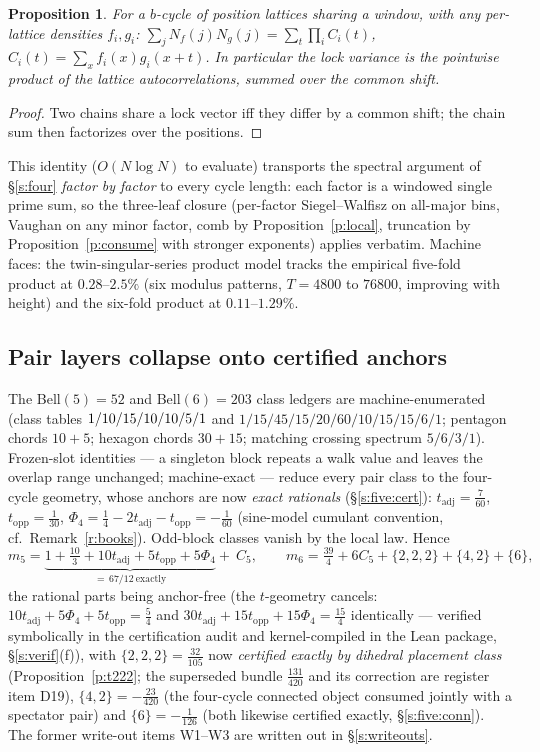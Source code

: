 \documentclass[11pt]{article}
\numberwithin{equation}{section}
\newtheorem{proposition}[theorem]{Proposition}
\theoremstyle{definition}
\theoremstyle{remark}
\begin{document}
\begin{proposition}\label{p:prod}
For a $b$-cycle of position lattices sharing a window, with any
per-lattice densities $f_i,g_i$:
$\sum_jN_f(j)N_g(j)=\sum_t\prod_iC_i(t)$,
$C_i(t)=\sum_xf_i(x)g_i(x+t)$. In particular the lock variance is
the pointwise product of the lattice autocorrelations, summed
over the common shift.
\end{proposition}

\begin{proof}
Two chains share a lock vector iff they differ by a common shift;
the chain sum then factorizes over the positions.
\end{proof}

This identity ($O(N\log N)$ to evaluate) transports the spectral
argument of \S\ref{s:four} \emph{factor by factor} to every cycle
length: each factor is a windowed single prime sum, so the
three-leaf closure (per-factor Siegel--Walfisz on all-major bins,
Vaughan on any minor factor, comb by Proposition~\ref{p:local},
truncation by Proposition~\ref{p:consume} with stronger
exponents) applies verbatim. Machine faces: the
twin-singular-series product model tracks the empirical five-fold
product at $0.28$--$2.5\%$ (six modulus patterns, $T=4800$ to
$76800$, improving with height) and the six-fold product at
$0.11$--$1.29\%$.

\subsection{Pair layers collapse onto certified anchors}

The Bell$(5)=52$ and Bell$(6)=203$ class ledgers are
machine-enumerated (class tables $1/10/15 \\
/10/10/5/1$ and
$1/15/45/15/20/60/10/15/15/6/1$; pentagon chords $10+5$; hexagon
chords $30+15$; matching crossing spectrum $5/6/3/1$).
Frozen-slot identities --- a singleton block repeats a walk value
and leaves the overlap range unchanged; machine-exact --- reduce
every pair class to the four-cycle geometry, whose anchors are
now \emph{exact rationals} (\S\ref{s:five:cert}):
$t_{\mathrm{adj}}=\tfrac7{60}$, $t_{\mathrm{opp}}=\tfrac1{30}$,
$\Phi_4=\tfrac14-2t_{\mathrm{adj}}-t_{\mathrm{opp}}=-\tfrac1{60}$
(sine-model cumulant convention, cf.\ Remark~\ref{r:books}).
Odd-block classes vanish by the local law. Hence
\[
m_5=\underbrace{1+\tfrac{10}3+10t_{\mathrm{adj}}
+5t_{\mathrm{opp}}+5\Phi_4}_{=\,67/12\ \text{exactly}}+\ C_5,
\qquad
m_6=\tfrac{39}4+6C_5+\{2,2,2\}+\{4,2\}+\{6\},
\]
the rational parts being anchor-free (the $t$-geometry cancels:
$10t_{\mathrm{adj}}+5\Phi_4+5t_{\mathrm{opp}}=\tfrac54$ and
$30t_{\mathrm{adj}}+15t_{\mathrm{opp}}+15\Phi_4=\tfrac{15}4$
identically --- verified symbolically in the certification
audit and kernel-compiled in the Lean package,
\S\ref{s:verif}(f)), with $\{2,2,2\}=\tfrac{32}{105}$ now
\emph{certified exactly by dihedral placement class}
(Proposition~\ref{p:t222}; the superseded bundle
$\tfrac{131}{420}$ and its correction are register item D19),
$\{4,2\}=-\tfrac{23}{420}$ (the four-cycle connected object
consumed jointly with a spectator pair) and
$\{6\}=-\tfrac1{126}$ (both likewise certified exactly,
\S\ref{s:five:conn}). The former write-out items W1--W3
are written out in \S\ref{s:writeouts}.
\end{document}
